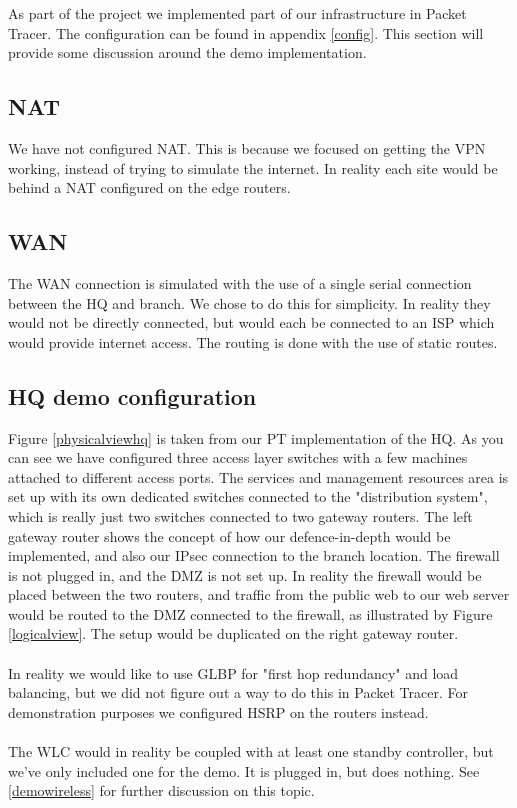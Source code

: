 

As part of the project we implemented part of our infrastructure in Packet Tracer. The configuration can be found in appendix \ref{config}. This section will provide some discussion around the demo implementation.

\subsection{NAT}

We have not configured NAT. This is because we focused on getting the VPN working, instead of trying to simulate the internet. In reality each site would be behind a NAT configured on the edge routers.

\subsection{WAN}

The WAN connection is simulated with the use of a single serial connection between the HQ and branch. We chose to do this for simplicity. In reality they would not be directly connected, but would each be connected to an ISP which would provide internet access. The routing is done with the use of static routes.

\subsection{HQ demo configuration}

Figure \ref{physicalviewhq} is taken from our PT implementation of the HQ. As you can see we have configured three access layer switches with a few machines attached to different access ports. The services and management resources area is set up with its own dedicated switches connected to the "distribution system", which is really just two switches connected to two gateway routers. The left gateway router shows the concept of how our defence-in-depth would be implemented, and also our IPsec connection to the branch location. The firewall is not plugged in, and the DMZ is not set up. In reality the firewall would be placed between the two routers, and traffic from the public web to our web server would be routed to the DMZ connected to the firewall, as illustrated by Figure \ref{logicalview}. The setup would be duplicated on the right gateway router.
\\
\\
In reality we would like to use GLBP for "first hop redundancy" and load balancing, but we did not figure out a way to do this in Packet Tracer. For demonstration purposes we configured HSRP on the routers instead.
\\
\\
The WLC would in reality be coupled with at least one standby controller, but we've only included one for the demo. It is plugged in, but does nothing. See \ref{demowireless} for further discussion on this topic.

